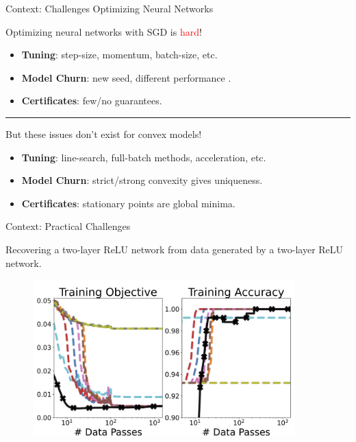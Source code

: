 \documentclass[usenames,dvipsnames,mathserif,notheorems]{beamer}
\newcommand{\horizontalrule}{
	{
			\vspace{-0.5em}
			\center \rule{\textwidth}{0.1em}
			\vspace{-0.2em}
		}
}
\begin{document}
\begin{frame}{Context: Challenges Optimizing Neural Networks}
	\begin{center}
		\Large
		Optimizing neural networks with SGD is \textcolor{red}{hard}!
	\end{center}

	\begin{itemize}
		\item \textbf{Tuning}: step-size, momentum, batch-size, etc.

		\item \textbf{Model Churn}: new seed, different
		      performance \citep{henderson2018deep}.

		\item \textbf{Certificates}: few/no guarantees.
	\end{itemize}

	\pause
	\horizontalrule

	\begin{center}
		\Large
		But these issues don't exist for convex models!
	\end{center}

	\begin{itemize}
		\item \textbf{Tuning}: line-search, full-batch methods, acceleration, etc.

		\item \textbf{Model Churn}: strict/strong convexity gives uniqueness.

		\item \textbf{Certificates}: stationary points are global minima.
	\end{itemize}


\end{frame}

\begin{frame}{Context: Practical Challenges}

	\begin{center}
		\large
		Recovering a two-layer ReLU network from data generated by a two-layer ReLU network.
	\end{center}

	\pause

	\begin{figure}[]
		\centering
		\includegraphics[width=0.9\textwidth]{assets/synthetic_classification.png}
	\end{figure}
\end{frame}
\end{document}

